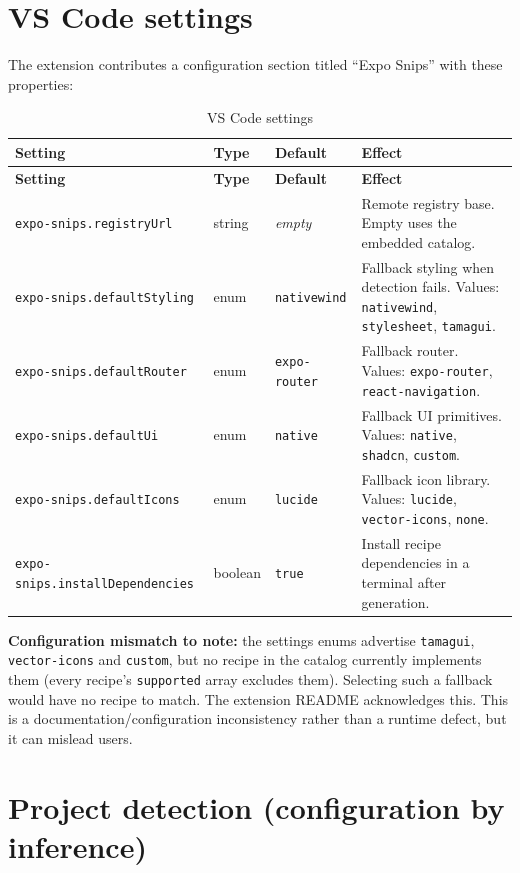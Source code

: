 \section{VS Code settings}

The extension contributes a configuration section titled ``Expo Snips'' with
these properties:

\begin{longtable}{@{}L{4.2cm}L{1.8cm}L{2.4cm}L{5.8cm}@{}}
\caption{VS Code settings}\\
\toprule
\textbf{Setting} & \textbf{Type} & \textbf{Default} & \textbf{Effect} \\
\midrule
\endfirsthead
\toprule
\textbf{Setting} & \textbf{Type} & \textbf{Default} & \textbf{Effect} \\
\midrule
\endhead
\texttt{expo-snips.registryUrl} & string & \textit{empty} & Remote registry base.
Empty uses the embedded catalog. \\
\texttt{expo-snips.defaultStyling} & enum & \texttt{nativewind} & Fallback styling
when detection fails. Values: \texttt{nativewind}, \texttt{stylesheet},
\texttt{tamagui}. \\
\texttt{expo-snips.defaultRouter} & enum & \texttt{expo-router} & Fallback router.
Values: \texttt{expo-router}, \texttt{react-navigation}. \\
\texttt{expo-snips.defaultUi} & enum & \texttt{native} & Fallback UI primitives.
Values: \texttt{native}, \texttt{shadcn}, \texttt{custom}. \\
\texttt{expo-snips.defaultIcons} & enum & \texttt{lucide} & Fallback icon library.
Values: \texttt{lucide}, \texttt{vector-icons}, \texttt{none}. \\
\texttt{expo-snips.installDependencies} & boolean & \texttt{true} & Install
recipe dependencies in a terminal after generation. \\
\bottomrule
\end{longtable}

\textbf{Configuration mismatch to note:} the settings enums advertise
\texttt{tamagui}, \texttt{vector-icons} and \texttt{custom}, but no recipe in the
catalog currently implements them (every recipe's \texttt{supported} array
excludes them). Selecting such a fallback would have no recipe to match. The
extension README acknowledges this. This is a documentation/configuration
inconsistency rather than a runtime defect, but it can mislead users.

\section{Project detection (configuration by inference)}

